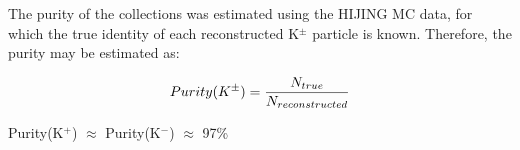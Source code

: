 \documentclass[../AnalysisNoteJBuxton.tex]{subfiles}
\begin{document}
The purity of the \Kpm collections was estimated using the HIJING MC data, for which the true identity of each reconstructed K$^{\pm}$ particle is known.  Therefore, the purity may be estimated as:

\begin{equation}
 Purity(K^{\pm}) = \frac{N_{true}}{N_{reconstructed}} \\
\label{eqn:KchPurity}
\end{equation}

Purity(K$^{+}$) $\approx$ Purity(K$^{-}$) $\approx$ 97\%
\end{document}
